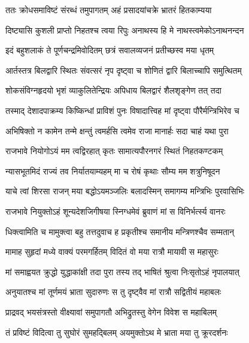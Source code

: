 
\twolineshloka
{ततः क्रोधसमाविष्टं संरब्धं तमुपागतम्}
{अहं प्रसादयांचक्रे भ्रातरं हितकाम्यया} %

\twolineshloka
{दिष्ट्यासि कुशली प्राप्तो निहतश्च त्वया रिपुः}
{अनाथस्य हि मे नाथस्त्वमेकोऽनाथनन्दन} %

\twolineshloka
{इदं बहुशलाकं ते पूर्णचन्द्रमिवोदितम्}
{छत्रं सवालव्यजनं प्रतीच्छस्व मया धृतम्} %

\twolineshloka
{आर्तस्तत्र बिलद्वारि स्थितः संवत्सरं नृप}
{दृष्ट्वा च शोणितं द्वारि बिलाच्चापि समुत्थितम्} %

\twolineshloka
{शोकसंविग्नहृदयो भृशं व्याकुलितेन्द्रियः}
{अपिधाय बिलद्वारं शैलशृङ्गेण तत् तदा} %

\twolineshloka
{तस्माद् देशादपाक्रम्य किष्किन्धां प्राविशं पुनः}
{विषादात्त्विह मां दृष्ट्वा पौरैर्मन्त्रिभिरेव च} %

\twolineshloka
{अभिषिक्तो न कामेन तन्मे क्षन्तुं त्वमर्हसि}
{त्वमेव राजा मानार्हः सदा चाहं यथा पुरा} %

\twolineshloka
{राजभावे नियोगोऽयं मम त्वद्विरहात् कृतः}
{सामात्यपौरनगरं स्थितं निहतकण्टकम्} %

\twolineshloka
{न्यासभूतमिदं राज्यं तव निर्यातयाम्यहम्}
{मा च रोषं कृथाः सौम्य मम शत्रुनिषूदन} %

\twolineshloka
{याचे त्वां शिरसा राजन् मया बद्धोऽयमञ्जलिः}
{बलादस्मिन् समागम्य मन्त्रिभिः पुरवासिभिः} %

\twolineshloka
{राजभावे नियुक्तोऽहं शून्यदेशजिगीषया}
{स्निग्धमेवं ब्रुवाणं मां स विनिर्भर्त्स्य वानरः} %

\twolineshloka
{धिक्त्वामिति च मामुक्त्वा बहु तत्तदुवाच ह}
{प्रकृतीश्च समानीय मन्त्रिणश्चैव सम्मतान्} %

\twolineshloka
{मामाह सुहृदां मध्ये वाक्यं परमगर्हितम्}
{विदितं वो मया रात्रौ मायावी स महासुरः} %

\twolineshloka
{मां समाह्वयत क्रुद्धो युद्धाकांक्षी तदा पुरा}
{तस्य तद् भाषितं श्रुत्वा निःसृतोऽहं नृपालयात्} %

\twolineshloka
{अनुयातश्च मां तूर्णमयं भ्राता सुदारुणः}
{स तु दृष्ट्वैव मां रात्रौ सद्वितीयं महाबलः} %

\twolineshloka
{प्राद्रवद् भयसंत्रस्तो वीक्ष्यावां समुपागतौ}
{अभिद्रुतस्तु वेगेन विवेश स महाबिलम्} %

\twolineshloka
{तं प्रविष्टं विदित्वा तु सुघोरं सुमहद्बिलम्}
{अयमुक्तोऽथ मे भ्राता मया तु क्रूरदर्शनः} %

